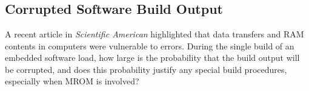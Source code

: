 \chapter{\cberzerolongtitle{}}

\label{cber0}

\section{Corrupted Software Build Output}

A recent article in \emph{Scientific American}
highlighted that data transfers and RAM contents in computers
were vulnerable to errors.  During the single build of
an embedded software load, how large is the probability
that the build output will be corrupted, and does this
probability justify any special build procedures, especially when
MROM is involved?


